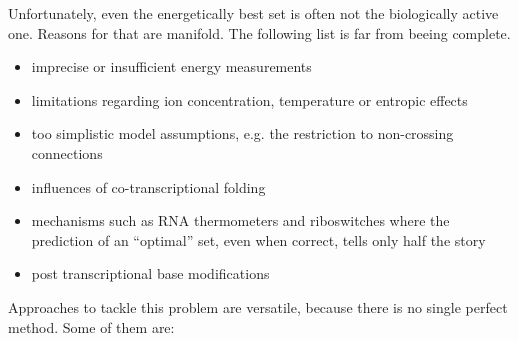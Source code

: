 \documentclass[paper=a4,fontsize=12pt]{scrartcl}
\begin{document}
Unfortunately, even the energetically best set is often not the biologically active one. Reasons for that are manifold. The following list is far from beeing complete. 
\begin{itemize}
	\item{imprecise or insufficient energy measurements \cite{MAT:TUR:2006}}
	\item{limitations regarding ion concentration, temperature or entropic effects}
	\item{too simplistic model assumptions, e.g. the restriction to non-crossing connections}
	\item{influences of co-transcriptional folding \cite{MEY:MIK:2004}}
	\item{mechanisms such as RNA thermometers and riboswitches \cite{MAN:BRE:2004,WAL:GAU:KLI:NAR:2009} where the prediction of an ``optimal'' set, even when correct, tells only half the story}
	\item{post transcriptional base modifications}
\end{itemize}
Approaches to tackle this problem are versatile, because there is no single perfect method. Some of them are: 
\end{document}
